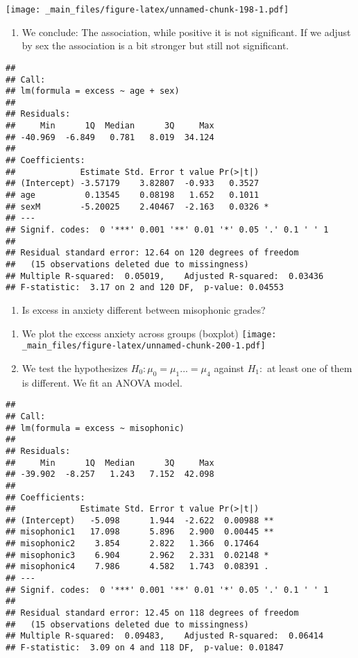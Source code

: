 \documentclass[
]{book}
\providecommand{\tightlist}{%
  \setlength{\itemsep}{0pt}\setlength{\parskip}{0pt}}
\begin{document}
\texttt{[image: \_main\_files/figure-latex/unnamed-chunk-198-1.pdf]}

\begin{enumerate}
\def\labelenumi{\alph{enumi}.}
\setcounter{enumi}{2}
\tightlist
\item
  We conclude: The association, while positive it is not significant. If we adjust by sex the association is a bit stronger but still not significant.
\end{enumerate}

\begin{verbatim}
## 
## Call:
## lm(formula = excess ~ age + sex)
## 
## Residuals:
##     Min      1Q  Median      3Q     Max 
## -40.969  -6.849   0.781   8.019  34.124 
## 
## Coefficients:
##             Estimate Std. Error t value Pr(>|t|)  
## (Intercept) -3.57179    3.82807  -0.933   0.3527  
## age          0.13545    0.08198   1.652   0.1011  
## sexM        -5.20025    2.40467  -2.163   0.0326 *
## ---
## Signif. codes:  0 '***' 0.001 '**' 0.01 '*' 0.05 '.' 0.1 ' ' 1
## 
## Residual standard error: 12.64 on 120 degrees of freedom
##   (15 observations deleted due to missingness)
## Multiple R-squared:  0.05019,    Adjusted R-squared:  0.03436 
## F-statistic:  3.17 on 2 and 120 DF,  p-value: 0.04553
\end{verbatim}

\begin{enumerate}
\def\labelenumi{\arabic{enumi}.}
\setcounter{enumi}{4}
\tightlist
\item
  Is excess in anxiety different between misophonic grades?
\end{enumerate}

\begin{enumerate}
\def\labelenumi{\alph{enumi}.}
\item
  We plot the excess anxiety across groups (boxplot)
  \texttt{[image: \_main\_files/figure-latex/unnamed-chunk-200-1.pdf]}
\item
  We test the hypothesizes \(H_0: \mu_{0}=\mu_{1} ... =\mu_{4}\) against \(H_1:\) at least one of them is different. We fit an ANOVA model.
\end{enumerate}

\begin{verbatim}
## 
## Call:
## lm(formula = excess ~ misophonic)
## 
## Residuals:
##     Min      1Q  Median      3Q     Max 
## -39.902  -8.257   1.243   7.152  42.098 
## 
## Coefficients:
##             Estimate Std. Error t value Pr(>|t|)   
## (Intercept)   -5.098      1.944  -2.622  0.00988 **
## misophonic1   17.098      5.896   2.900  0.00445 **
## misophonic2    3.854      2.822   1.366  0.17464   
## misophonic3    6.904      2.962   2.331  0.02148 * 
## misophonic4    7.986      4.582   1.743  0.08391 . 
## ---
## Signif. codes:  0 '***' 0.001 '**' 0.01 '*' 0.05 '.' 0.1 ' ' 1
## 
## Residual standard error: 12.45 on 118 degrees of freedom
##   (15 observations deleted due to missingness)
## Multiple R-squared:  0.09483,    Adjusted R-squared:  0.06414 
## F-statistic:  3.09 on 4 and 118 DF,  p-value: 0.01847
\end{verbatim}
\end{document}
